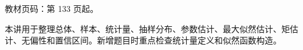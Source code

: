 
\begin{knowledgeBox}
教材页码：第 133 页起。

本讲用于整理总体、样本、统计量、抽样分布、参数估计、最大似然估计、矩估计、无偏性和置信区间。新增题目时重点检查统计量定义和似然函数构造。
\end{knowledgeBox}

